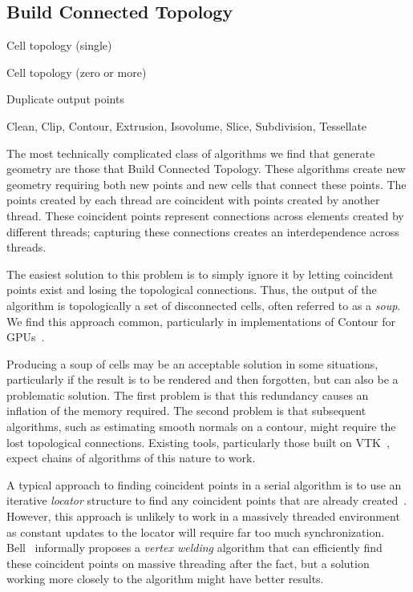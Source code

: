 \documentclass{sig-alternate}
\newcommand*{\lcite}[1]{~\cite{#1}}
\newcommand*{\scite}[1]{~\cite{#1}}
\newcommand*{\keyterm}[1]{\emph{#1}}
\newcommand{\algclass}[1]{\textsf{#1}}
\newcommand{\alg}[1]{#1}
\newcommand{\algorithmclasssection}[1]{\subsection*{#1}}
\newcommand{\algorithmclass}[5]{
  \algorithmclasssection{#1} %
  \begin{description}[leftmargin=9em,style=nextline,noitemsep]
    \raggedright
  \item[Input] #2
  \item[Output] #3
  \item[Interdependence] #4
  \item[Algorithms] #5
  \end{description}
}
\begin{document}
\algorithmclass{Build Connected Topology}
               {Cell topology (single)} %
               {Cell topology (zero or more)} %
               {Duplicate output points} %
               {
                 Clean,
                 Clip,
                 Contour,
                 Extrusion,
                 Isovolume,
                 Slice,
                 Subdivision,
                 Tessellate
               }

\noindent
The most technically complicated class of algorithms we find that generate
geometry are those that \algclass{Build Connected Topology}. These
algorithms create new geometry requiring both new points and new cells that
connect these points. The points created by each thread are coincident with
points created by another thread. These coincident points represent
connections across elements created by different threads; capturing these
connections creates an interdependence across threads.

The easiest solution to this problem is to simply ignore it by letting
coincident points exist and losing the topological connections. Thus, the
output of the algorithm is topologically a set of disconnected cells, often
referred to as a \keyterm{soup}. We find this approach common, particularly
in implementations of \alg{Contour} for
GPUs\lcite{PISTON,Dyken2008,Pascucci2004,Klein2004}.

Producing a soup of cells may be an acceptable solution in some situations,
particularly if the result is to be rendered and then forgotten, but can
also be a problematic solution. The first problem is that this redundancy
causes an inflation of the memory required. The second problem is that
subsequent algorithms, such as estimating smooth normals on a contour,
might require the lost topological connections. Existing tools,
particularly those built on VTK\lcite{VTK}, expect chains of algorithms of
this nature to work.

A typical approach to finding coincident points in a serial algorithm is to
use an iterative \keyterm{locator} structure to find any coincident points
that are already created\lcite{VTKUsersGuide}. However, this approach is
unlikely to work in a massively threaded environment as constant updates to
the locator will require far too much synchronization. Bell\scite{Bell2010}
informally proposes a \keyterm{vertex welding} algorithm that can
efficiently find these coincident points on massive threading after the
fact, but a solution working more closely to the algorithm might have
better results.
\end{document}
